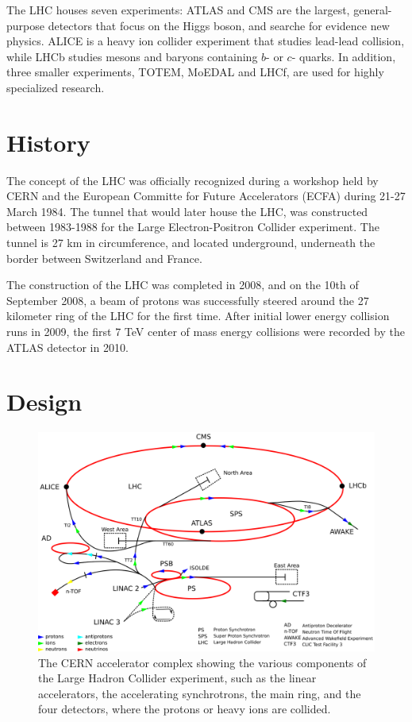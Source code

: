 \documentclass[11pt,a4paper,openright,twoside]{report}
\begin{document}
The LHC houses seven experiments: ATLAS and CMS are the largest, general-purpose detectors that focus on the Higgs boson, and searche for evidence new physics. ALICE is a heavy ion collider experiment that studies lead-lead collision, while LHCb studies mesons and baryons containing $b$- or $c$- quarks. In addition, three smaller experiments, TOTEM, MoEDAL and LHCf, are used for highly specialized research.

\section{History}
The concept of the LHC was officially recognized during a workshop held by CERN and the European Committe for Future Accelerators (ECFA) during 21-27 March 1984. The tunnel that would later house the LHC, was constructed between 1983-1988 for the Large Electron-Positron Collider experiment. The tunnel is 27 km in circumference, and located underground, underneath the border between Switzerland and France.

The construction of the LHC was completed in 2008, and on the 10th of September 2008, a beam of protons was successfully steered around the 27 kilometer ring of the LHC for the first time. After initial lower energy collision runs in 2009, the first 7 TeV center of mass energy collisions were recorded by the ATLAS detector in 2010.
\vfill

\section{Design}
\begin{figure}[H]
\centering
	\includegraphics[width=0.9\linewidth]{Cern_accelerator_complex.png}
	\caption{The CERN accelerator complex showing the various components of the Large Hadron Collider experiment, such as the linear accelerators, the accelerating synchrotrons, the main ring, and the four detectors, where the protons or heavy ions are collided.}
		\label{fig:LHCring}
\end{figure}
\end{document}

